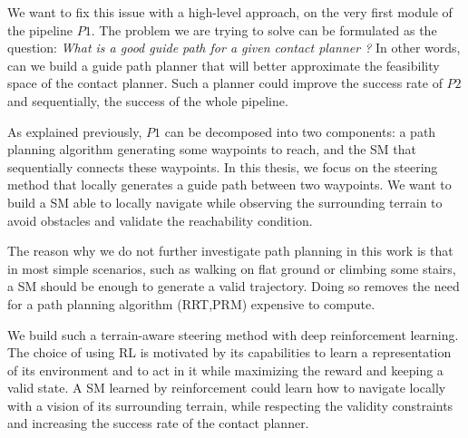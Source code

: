 We want to fix this issue with a high-level approach, on the very first module of the pipeline $P1$.
The problem we are trying to solve can be formulated as the question: \textit{What is a good guide path for a given contact planner ?} 
In other words, can we build a guide path planner that will better approximate the feasibility space of the contact planner. Such a planner could improve the success rate of $P2$ and sequentially, the success of the whole pipeline.

As explained previously, $P1$ can be decomposed into two components: a path planning algorithm generating some waypoints to reach, and the SM that sequentially connects these waypoints.
In this thesis, we focus on the steering method that locally generates a guide path between two waypoints.
We want to build a SM able to locally navigate while observing the surrounding terrain to avoid obstacles and validate the reachability condition. 

The reason why we do not further investigate path planning in this work is that in most simple scenarios, such as walking on flat ground or climbing some stairs, a SM should be enough to generate a valid trajectory. Doing so removes the need for a path planning algorithm (RRT,PRM) expensive to compute.

We build such a terrain-aware steering method with deep reinforcement learning.
The choice of using RL is motivated by its capabilities to learn a representation of its environment and to act in it while maximizing the reward and keeping a valid state.
A SM learned by reinforcement could learn how to navigate locally with a vision of its surrounding terrain, while respecting the validity constraints and increasing the success rate of the contact planner.

